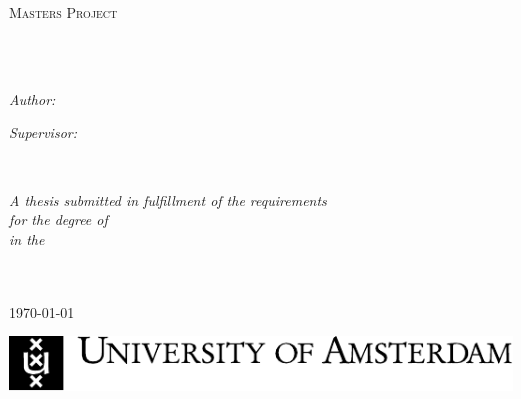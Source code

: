 \begin{titlepage}
    \begin{center}
        \vspace*{.06\textheight}
        {\scshape\LARGE \univname\par}
        \vspace{1.5cm} 
        
        \textsc{\Large Masters Project}\\[0.5cm] 
        
        \HRule \\[0.4cm]
        {\huge \bfseries \ttitle\par}
        \vspace{0.4cm} 
        \HRule \\[1.5cm] 
         
        \begin{minipage}[t]{0.4\textwidth}
            \begin{flushleft} 
                \large
                \emph{Author:}\\                \href{https://www.linkedin.com/in/paul-spencer-4789085/}{\authorname}
            \end{flushleft}
        \end{minipage}
        \begin{minipage}[t]{0.4\textwidth}
            \begin{flushright} 
                \large
                \emph{Supervisor:} \\                \href{https://www.uva.nl/en/profile/d/e/y.demschenko/y.demschenko.html}{\supname} 
            \end{flushright}
        \end{minipage}\\[3cm]     
        
        \vfill
        
        \large 
        \textit{
            A thesis submitted in fulfillment of the requirements\\ 
            for the degree of \degreename}\\[0.3cm] 
            
        \textit{in the}\\[0.4cm]
        
        \groupname\\\deptname\\[2cm] 
        
        \vfill
        
        {\large \today}\\[2cm]
        
        \vfill
                
        \includegraphics{Graphics/logoUvA_en.pdf} 
        
        \vfill
    \end{center}
\end{titlepage}
